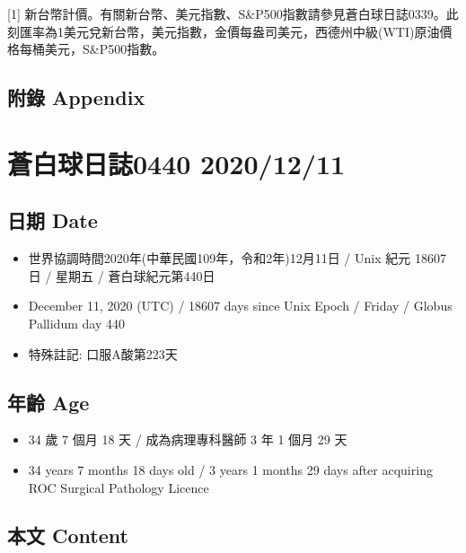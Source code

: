 \documentclass[
]{article}
\providecommand{\tightlist}{%
  \setlength{\itemsep}{0pt}\setlength{\parskip}{0pt}}
\begin{document}
{[}1{]}
新台幣計價。有關新台幣、美元指數、S\&P500指數請參見蒼白球日誌0339。此刻匯率為1美元兌新台幣，美元指數，金價每盎司美元，西德州中級(WTI)原油價格每桶美元，S\&P500指數。

\hypertarget{ux9644ux9304-appendix-9}{%
\subsection{附錄 Appendix}\label{ux9644ux9304-appendix-9}}

\hypertarget{ux84bcux767dux7403ux65e5ux8a8c0440-20201211}{%
\section{蒼白球日誌0440
2020/12/11}\label{ux84bcux767dux7403ux65e5ux8a8c0440-20201211}}

\hypertarget{ux65e5ux671f-date-10}{%
\subsection{日期 Date}\label{ux65e5ux671f-date-10}}

\begin{itemize}
\tightlist
\item
  世界協調時間2020年(中華民國109年，令和2年)12月11日 / Unix 紀元 18607
  日 / 星期五 / 蒼白球紀元第440日
\item
  December 11, 2020 (UTC) / 18607 days since Unix Epoch / Friday /
  Globus Pallidum day 440
\item
  特殊註記: 口服A酸第223天
\end{itemize}

\hypertarget{ux5e74ux9f61-age-10}{%
\subsection{年齡 Age}\label{ux5e74ux9f61-age-10}}

\begin{itemize}
\tightlist
\item
  34 歲 7 個月 18 天 / 成為病理專科醫師 3 年 1 個月 29 天
\item
  34 years 7 months 18 days old / 3 years 1 months 29 days after
  acquiring ROC Surgical Pathology Licence
\end{itemize}

\hypertarget{ux672cux6587-content-10}{%
\subsection{本文 Content}\label{ux672cux6587-content-10}}
\end{document}
